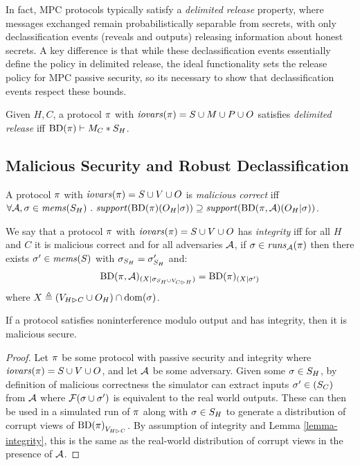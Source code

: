 In fact, MPC protocols typically satisfy a \emph{delimited release}
property\cite{XXX}, where messages exchanged remain probabilistically separable
from secrets, with only declassification events (reveals and outputs)
releasing information about honest secrets. A key difference is that while
these declassification events essentially define the policy in delimited
release, the ideal functionality sets the release policy for MPC
passive security, so its necessary to show that declassification events respect
these bounds.
\begin{definition}
  Given $H,C$, a protocol $\pi$ with $\mathit{iovars}(\pi) = S \cup M \cup P \cup O$
  satisfies \emph{delimited release} iff
  $\mathrm{BD}(\pi) \vdash M_C * S_H$.
\end{definition}

\subsection{Malicious Security and Robust Declassification}

\begin{definition}
  A protocol $\pi$ with $\mathit{iovars}(\pi) = S \cup V \cup O$ is \emph{malicious correct} iff
  $
  \forall \adversary, \store \in \mems(S_H) \ .\ \support(\progtt(\prog)(O_H|\store)) \supseteq
    \support(\progtt(\prog,\adversary)(O_H|\store))
  $.
\end{definition}

\begin{definition}[Integrity]
  We say that a protocol $\pi$ with $\mathit{iovars}(\pi) = S \cup V \cup O$ has
  \emph{integrity} iff for all $H$ and $C$ 
  it is malicious correct and for all adversaries $\mathcal{A}$,
  if $\sigma \in \mathit{runs}_{\mathcal{A}}(\pi)$ 
  then there exists $\sigma' \in \mathit{mems}(S)$ with $\sigma_{S_H} = \sigma'_{S_H} $ and:
    $$
    \mathrm{BD}(\pi,\mathcal{A})_{({X}|{\sigma_{S_H \cup V_{C \rhd H}}})} =
    \mathrm{BD}(\pi)_{({X}|{\sigma'})}
    $$ 
  where $X \triangleq (V_{H \rhd C} \cup O_H) \cap \mathrm{dom}(\sigma)$. 
\end{definition}

\begin{theorem}
  If a protocol satisfies noninterference modulo output and has
  integrity, then it is malicious secure.
\end{theorem}

\begin{proof}
  Let $\pi$ be some protocol with passive security and integrity
  where $\mathit{iovars}(\pi) = S \cup V \cup O$, and let $\mathcal{A}$ be some
  adversary.  Given some $\sigma\in S_H$, by definition of malicious
  correctness the simulator can extract inputs $\sigma' \in (S_C)$
  from $\mathcal{A}$ where $\mathcal{F}(\sigma \cup \sigma')$ is equivalent
  to the real world outputs. These can then be used in a simulated run
  of $\pi$ along with $\sigma \in S_H$ to generate a distribution
  of corrupt views of ${\mathrm{BD}(\pi)}_{V_{H \rhd C}}$.
  By assumption of integrity and Lemma \ref{lemma-integrity},
  this is the same as the real-world distribution of corrupt views
  in the presence of $\mathcal{A}$. 
\end{proof}


